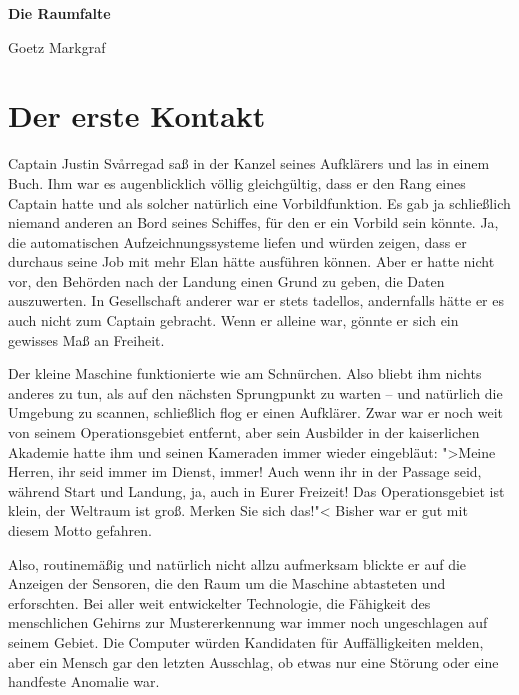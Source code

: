 \documentclass[11pt,twoside,openany]{scrbook}
\newcommand{\romantitel}{Die Raumfalte}
\newcommand{\romanautor}{Goetz Markgraf}
\begin{document}

\begin{titlepage}
  \thispagestyle{empty}
  \centering
  \vspace*{0.22\textheight}

  \vspace{2.5em}
  {\huge\bfseries \romantitel\par}
  \vspace{3em}
  {\Large \romanautor\par}

  \vfill
\end{titlepage}

\tableofcontents

\chapter{Der erste Kontakt}

Captain Justin Svårregad saß in der Kanzel seines Aufklärers und las in einem Buch. Ihm war es augenblicklich völlig gleichgültig, dass er den Rang eines Captain hatte und als solcher natürlich eine Vorbildfunktion. Es gab ja schließlich niemand anderen an Bord seines Schiffes, für den er ein Vorbild sein könnte. Ja, die automatischen Aufzeichnungssysteme liefen und würden zeigen, dass er durchaus seine Job mit mehr Elan hätte ausführen können. Aber er hatte nicht vor, den Behörden nach der Landung einen Grund zu geben, die Daten auszuwerten. In Gesellschaft anderer war er stets tadellos, andernfalls hätte er es auch nicht zum Captain gebracht. Wenn er alleine war, gönnte er sich ein gewisses Maß an Freiheit.

Der kleine Maschine funktionierte wie am Schnürchen. Also bliebt ihm nichts anderes zu tun, als auf den nächsten Sprungpunkt zu warten -- und natürlich die Umgebung zu scannen, schließlich flog er einen Aufklärer. Zwar war er noch weit von seinem Operationsgebiet entfernt, aber sein Ausbilder in der kaiserlichen Akademie hatte ihm und seinen Kameraden immer wieder eingebläut: ">Meine Herren, ihr seid immer im Dienst, immer! Auch wenn ihr in der Passage seid, während Start und Landung, ja, auch in Eurer Freizeit! Das Operationsgebiet ist klein, der Weltraum ist groß. Merken Sie sich das!"< Bisher war er gut mit diesem Motto gefahren.

Also, routinemäßig und natürlich nicht allzu aufmerksam blickte er auf die Anzeigen der Sensoren, die den Raum um die Maschine abtasteten und erforschten. Bei aller weit entwickelter Technologie, die Fähigkeit des menschlichen Gehirns zur Mustererkennung war immer noch ungeschlagen auf seinem Gebiet. Die Computer würden Kandidaten für Auffälligkeiten melden, aber ein Mensch gar den letzten Ausschlag, ob etwas nur eine Störung oder eine handfeste Anomalie war.
\end{document}
